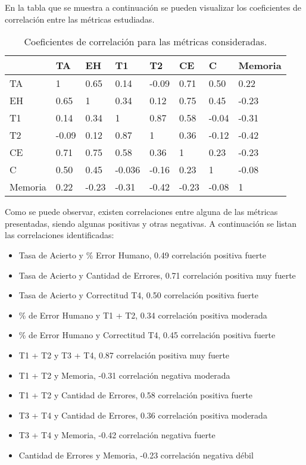 En la tabla que se muestra a continuaci\'on se pueden visualizar los coeficientes de correlaci\'on entre las m\'etricas estudiadas.

\begin{table}[H]
\centering
\footnotesize
\begin{tabular}{|p{1.6cm}|p{1.6cm}|p{1.6cm}|p{1.6cm}|p{1.6cm}|p{1.6cm}|p{1.6cm}|p{1.6cm}|}
\hline
                    &    TA & EH & T1 & T2 & CE & C & Memoria \\
\hline
TA     & 1 & 0.65 & 0.14 & -0.09 & 0.71 & 0.50 & 0.22 \\
EH        & 0.65 & 1 & 0.34 & 0.12 & 0.75 & 0.45 & -0.23 \\
T1                & 0.14 & 0.34 & 1 & 0.87 & 0.58 & -0.04 & -0.31 \\
T2                & -0.09 & 0.12 & 0.87 & 1 & 0.36 & -0.12 & -0.42 \\
CE    & 0.71 & 0.75 & 0.58 & 0.36 & 1 & 0.23 & -0.23 \\
C         & 0.50 & 0.45 & -0.036 & -0.16 & 0.23 & 1 & -0.08 \\
Memoria                & 0.22 & -0.23 & -0.31 & -0.42 & -0.23 & -0.08 & 1 \\
\hline
\end{tabular}
\caption{Coeficientes de correlaci\'on para las m\'etricas consideradas.}
\label{sec:tabla-correlacion}
\end{table}

Como se puede observar, existen correlaciones entre alguna de las m\'etricas presentadas, 
siendo algunas positivas y otras negativas. A continuaci\'on se listan las correlaciones identificadas:

\begin{itemize}
    \item Tasa de Acierto y \% Error Humano, 0.49 correlaci\'on positiva fuerte
    \item Tasa de Acierto y Cantidad de Errores, 0.71 correlaci\'on positiva muy fuerte
    \item Tasa de Acierto y Correctitud T4, 0.50 correlaci\'on positiva fuerte 
    \item \% de Error Humano y T1 + T2, 0.34 correlaci\'on positiva moderada
    \item \% de Error Humano y Correctitud T4, 0.45 correlaci\'on positiva fuerte
    \item T1 + T2 y T3 + T4, 0.87 correlaci\'on positiva muy fuerte
    \item T1 + T2 y Memoria, -0.31 correlaci\'on negativa moderada
    \item T1 + T2 y Cantidad de Errores, 0.58 correlaci\'on positiva fuerte
    \item T3 + T4 y Cantidad de Errores, 0.36 correlaci\'on positiva moderada
    \item T3 + T4 y Memoria, -0.42 correlaci\'on negativa fuerte
    \item Cantidad de Errores y Memoria, -0.23 correlaci\'on negativa d\'ebil
\end{itemize}
